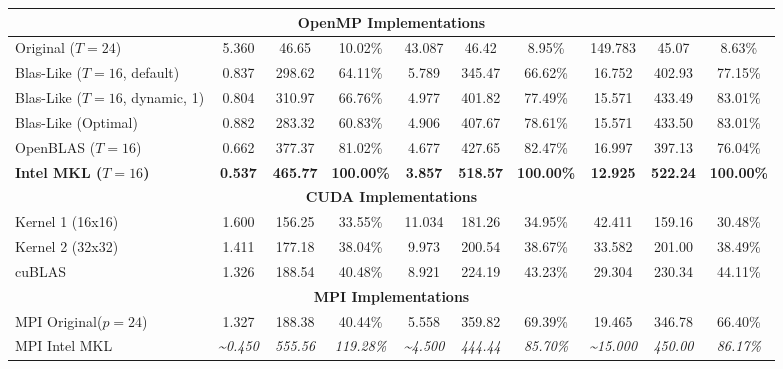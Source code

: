 \begin{table}[H]
{\begin{threeparttable}
\begin{tabular}{l|ccc|ccc|ccc}
    \midrule
    \multicolumn{10}{c}{\textbf{OpenMP Implementations}} \\
    \midrule
    Original ($T=24$)                        & 5.360 & 46.65 & 10.02\% & 43.087 & 46.42 & 8.95\%  & 149.783 & 45.07 & 8.63\% \\
    Blas-Like ($T=16$, default)              & 0.837 & 298.62 & 64.11\% & 5.789 & 345.47 & 66.62\% & 16.752 & 402.93 & 77.15\% \\
    Blas-Like ($T=16$, dynamic, 1)           & 0.804 & 310.97 & 66.76\% & 4.977 & 401.82 & 77.49\% & 15.571 & 433.49 & 83.01\% \\
    Blas-Like (Optimal)\tnote{2}             & 0.882 & 283.32 & 60.83\% & 4.906 & 407.67 & 78.61\% & 15.571 & 433.50 & 83.01\% \\
    OpenBLAS ($T=16$)                        & 0.662 & 377.37 & 81.02\% & 4.677 & 427.65 & 82.47\% & 16.997 & 397.13 & 76.04\% \\
    \textbf{Intel MKL ($T=16$)}              & \textbf{0.537} & \textbf{465.77} & \textbf{100.00\%} & \textbf{3.857} & \textbf{518.57} & \textbf{100.00\%} & \textbf{12.925} & \textbf{522.24} & \textbf{100.00\%} \\

    \midrule
    \multicolumn{10}{c}{\textbf{CUDA Implementations}} \\
    \midrule
    Kernel 1 (16x16)                         & 1.600 & 156.25 & 33.55\% & 11.034 & 181.26 & 34.95\% & 42.411 & 159.16 & 30.48\% \\
    Kernel 2 (32x32)                         & 1.411 & 177.18 & 38.04\% & 9.973  & 200.54 & 38.67\% & 33.582 & 201.00 & 38.49\% \\
    cuBLAS                                   & 1.326 & 188.54 & 40.48\% & 8.921  & 224.19 & 43.23\% & 29.304 & 230.34 & 44.11\% \\

    \midrule
    \multicolumn{10}{c}{\textbf{MPI Implementations}} \\
    \midrule
    MPI Original($p=24$)                             & 1.327 & 188.38 & 40.44\% & 5.558  & 359.82 & 69.39\% & 19.465 & 346.78 & 66.40\% \\
    MPI Intel MKL\tnote{3}                & \textit{\textasciitilde 0.450} & \textit{555.56} & \textit{119.28\%} & \textit{\textasciitilde 4.500} & \textit{444.44} & \textit{85.70\%} & \textit{\textasciitilde 15.000} & \textit{450.00} & \textit{86.17\%} \\
    
    \bottomrule
    \end{tabular}
    

\end{threeparttable}}
\end{table}
